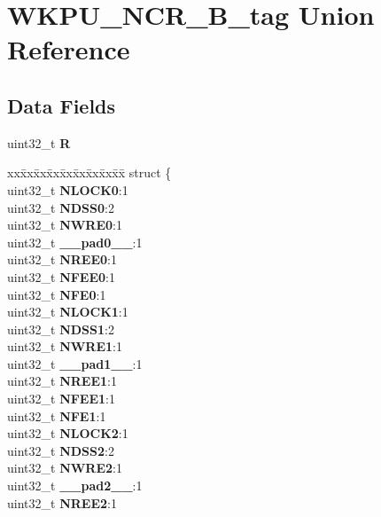 \hypertarget{unionWKPU__NCR__32B__tag}{}\section{W\+K\+P\+U\+\_\+\+N\+C\+R\+\_\+B\+\_\+tag Union Reference}
\label{unionWKPU__NCR__32B__tag}
\subsection*{Data Fields}
\begin{DoxyCompactItemize}
\item 
\mbox{\label{unionWKPU__NCR__32B__tag_af55b4b65ef59db705c56481fe5d07e02}} 
uint32\+\_\+t {\bfseries R}
\item 
\mbox{\label{unionWKPU__NCR__32B__tag_a11c143b5ecf8aacfd8066856c211ab07}} 
\begin{tabbing}
xx\=xx\=xx\=xx\=xx\=xx\=xx\=xx\=xx\=\kill
struct \{\\
\>uint32\_t {\bfseries NLOCK0}:1\\
\>uint32\_t {\bfseries NDSS0}:2\\
\>uint32\_t {\bfseries NWRE0}:1\\
\>uint32\_t {\bfseries \_\_pad0\_\_}:1\\
\>uint32\_t {\bfseries NREE0}:1\\
\>uint32\_t {\bfseries NFEE0}:1\\
\>uint32\_t {\bfseries NFE0}:1\\
\>uint32\_t {\bfseries NLOCK1}:1\\
\>uint32\_t {\bfseries NDSS1}:2\\
\>uint32\_t {\bfseries NWRE1}:1\\
\>uint32\_t {\bfseries \_\_pad1\_\_}:1\\
\>uint32\_t {\bfseries NREE1}:1\\
\>uint32\_t {\bfseries NFEE1}:1\\
\>uint32\_t {\bfseries NFE1}:1\\
\>uint32\_t {\bfseries NLOCK2}:1\\
\>uint32\_t {\bfseries NDSS2}:2\\
\>uint32\_t {\bfseries NWRE2}:1\\
\>uint32\_t {\bfseries \_\_pad2\_\_}:1\\
\>uint32\_t {\bfseries NREE2}:1\\

\end{tabbing}
\end{DoxyCompactItemize}
